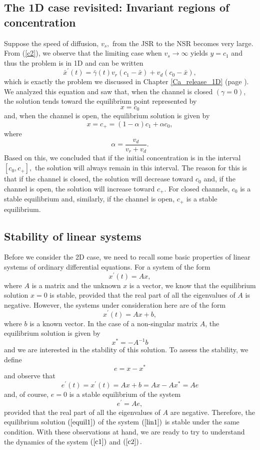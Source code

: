 \subsection{The 1D case revisited: Invariant regions of concentration}

Suppose the speed of diffusion, $v_{s},$ from the JSR to the NSR becomes very large.
From (\ref{c2}), we observe that the limiting case when $v_{s}\rightarrow
\infty$ yields $y=c_{1}$ and thus the problem is in 1D and can be written%
\[
\bar{x}^{\prime}(t)=\bar{\gamma}(t)v_{r}\left(  c_{1}-\bar{x}\right)
+v_{d}\left(  c_{0}-\bar{x}\right)  ,
\]
which is exactly the problem we discussed in Chapter \ref{Ca_release_1D} (page \pageref{stoch}). 
We analyzed this equation and saw that, when the channel is closed
$(\gamma=0)$, the solution tends toward the equilibrium point represented by
\[
x=c_{0}%
\]
and, when the channel is open, the equilibrium solution is given by%
\[
x=c_{+}=\left(  1-\alpha\right)  c_{1}+\alpha c_{0},%
\]
where%
\[
\alpha=\frac{v_{d}}{v_{r}+v_{d}}.
\]
Based on this, we concluded that if the initial concentration is in the
interval $\left[  c_{0},c_{+}\right]  ,$ the solution will always remain in
this interval. The reason for this is that if the channel is closed, the
solution will decrease toward $c_{0}$ and, if the channel is open, the
solution will increase toward $c_{+}.$ For closed channels, $c_{0}$ is a
stable equilibrium and, similarly, if the channel is open, $c_{+}$ is a stable equilibrium.

\subsection{Stability of linear systems}

Before we consider the 2D case, we need to recall some basic properties of
linear systems of ordinary differential equations. For a system of the form
\[
x^{\prime}(t)=Ax,
\]
where $A$ is a matrix and the unknown $x$ is a vector, we know that the
equilibrium solution $x=0$ is stable, provided that the real part of all the
eigenvalues of $A$ is negative. However, the systems under consideration here
are of the form
\begin{equation}
x^{\prime}(t)=Ax+b, \label{lin1}%
\end{equation}
where $b$ is a known vector. In the case of a non-singular matrix $A$, the
equilibrium solution is given by%
\begin{equation}
x^{\ast}=-A^{-1}b \label{equil1}%
\end{equation}
and we are interested in the stability of this solution. To assess
the stability, we define%
\[
e=x-x^{\ast}%
\]
and observe that%
\[
e^{\prime}(t)=x^{\prime}(t)=Ax+b=Ax-Ax^{\ast}=Ae
\]
and, of course, $e=0$ is a stable equilibrium of the system%
\[
e^{\prime}=Ae,
\]
provided that the real part of all the eigenvalues of $A$ are negative. 
Therefore,
the equilibrium solution $\left(  \ref{equil1}\right) $ of the system $\left(
\ref{lin1}\right)  $ is stable under the same condition. With these observations
at hand, we are ready to try to understand the dynamics of the system $\left(
\ref{c1}\right)$ and $\left(\ref{c2}\right).$

